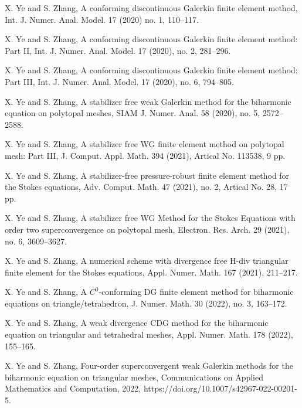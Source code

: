 \documentclass[11pt]{amsart}
\begin{document}
\begin{thebibliography}{99}
 X. Ye and S. Zhang,
A conforming discontinuous Galerkin finite element method,
    Int. J. Numer. Anal. Model.   17 (2020) no. 1, 110--117.


 X. Ye and S. Zhang,
A conforming discontinuous Galerkin finite element method: Part II,
  Int. J. Numer. Anal. Model. 17 (2020), no. 2, 281--296.


X. Ye and S. Zhang,
A conforming discontinuous Galerkin finite element method: Part III,
 Int. J. Numer. Anal. Model. 17 (2020), no. 6, 794--805.

X. Ye and S. Zhang,
A stabilizer free weak Galerkin
  method for the biharmonic equation on polytopal meshes,
 SIAM J. Numer. Anal. 58 (2020), no. 5, 2572--2588.


X. Ye and S. Zhang, A stabilizer free WG finite element method on polytopal mesh: Part III,
   J. Comput. Appl. Math. 394 (2021), Artical No. 113538, 9 pp.


 X. Ye and S. Zhang,
   A stabilizer-free pressure-robust finite element method for the Stokes equations,
 Adv. Comput. Math. 47 (2021), no. 2, Artical No. 28, 17 pp.


X. Ye and S. Zhang,
A stabilizer free WG Method for the Stokes Equations with
  order two superconvergence on polytopal mesh,
 Electron. Res. Arch. 29 (2021), no. 6, 3609--3627.

X. Ye and S. Zhang,
A numerical scheme with divergence free H-div triangular finite element  for the Stokes equations,
  Appl. Numer. Math. 167 (2021), 211--217.


X. Ye and S. Zhang,
A $C^0$-conforming DG finite element method for biharmonic equations on triangle/tetrahedron,
 J. Numer. Math. 30 (2022), no. 3, 163--172.

X. Ye and S. Zhang, A weak divergence CDG method for the biharmonic equation on triangular and tetrahedral meshes, Appl. Numer. Math. 178 (2022), 155--165.

X. Ye and S. Zhang, Four-order superconvergent weak Galerkin  methods for the biharmonic equation on triangular meshes, Communications on Applied Mathematics and Computation, 2022, https://doi.org/10.1007/s42967-022-00201-5.


\end{thebibliography}
\end{document}
